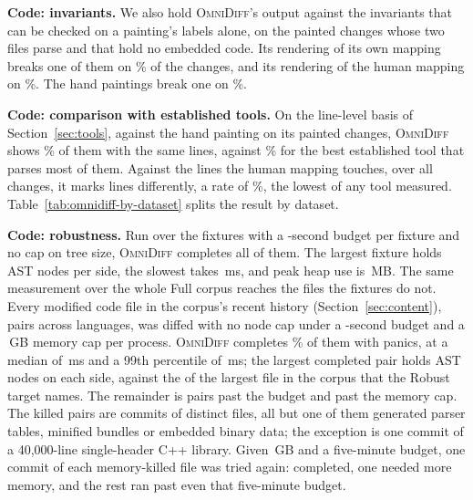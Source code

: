 \documentclass[sigconf,review]{acmart}
\begin{document}
\textbf{Code: invariants.} We also hold \textsc{OmniDiff}'s output against the
\InvariantLabelCount{} invariants that can be checked on a painting's labels alone, on the
\InvariantFixtures{} painted changes whose two files parse and that hold no embedded code. Its
rendering of its own mapping breaks one of them on \InvariantLabelToolRenderedFixturesPct{}\% of
the changes, and its rendering of the human mapping on
\InvariantLabelHumanRenderedFixturesPct{}\%. The hand paintings break one on
\InvariantLabelHumanFixturesPct{}\%.

\textbf{Code: comparison with established tools.} On the line-level basis of
Section~\ref{sec:tools}, against the hand painting on its \OmniDiffPaintingLineFixtures{} painted
changes, \textsc{OmniDiff} shows \OmniDiffPaintingLinePerfectPct{}\% of them with the same lines,
against \DifftasticPaintingLinePerfectPct{}\% for the best established tool that parses most of
them. Against the lines the human mapping touches, over all \OmniDiffFixtures{} changes, it marks
\OmniDiffLineMismatches{} lines differently, a rate of \OmniDiffLineRate{}\%, the lowest of any
tool measured. Table~\ref{tab:omnidiff-by-dataset} splits the result by
dataset.



\textbf{Code: robustness.} Run over the \RobustnessFixtures{} fixtures with a
\RobustnessTimeoutSeconds{}-second budget per fixture and no cap on tree size,
\textsc{OmniDiff} completes all of them. The largest fixture holds \RobustnessMaxNodes{}
AST nodes per side, the slowest takes \RobustnessSlowestMs{}\,ms, and peak heap use is
\RobustnessPeakMemoryMb{}\,MB. The same measurement over the whole Full corpus reaches the files
the fixtures do not. Every modified code file in the corpus's recent history
(Section~\ref{sec:content}), \RobustnessFullAttempted{} pairs across
\RobustnessFullLanguages{} languages, was diffed with no node cap under a
\RobustnessFullTimeoutSeconds{}-second budget and a \RobustnessFullMemoryCapGb{}\,GB memory cap
per process. \textsc{OmniDiff} completes \RobustnessFullCompletedPct{}\% of them with
\RobustnessFullPanicked{} panics, at a median of \RobustnessFullPFiftyMs{}\,ms and a 99th
percentile of \RobustnessFullPNinetyNineMs{}\,ms; the largest completed pair holds
\RobustnessFullMaxSideNodes{} AST nodes on each side, against the \AstMax{} of the largest file
in the corpus that the Robust target names. The remainder is \RobustnessFullTimedOut{} pairs past
the budget and \RobustnessFullKilled{} past the memory cap. The killed pairs are commits of
\RobustnessFullKilledFiles{} distinct files, all but one of them generated parser tables,
minified bundles or embedded binary data; the exception is one commit of a 40,000-line
single-header C++ library. Given \RobustnessFullBigMemoryCapGb{}\,GB and a five-minute budget, one
commit of each memory-killed file was tried again: \RobustnessFullKilledFilesCompletedUnderBigCap{}
completed, one needed more memory, and the rest ran past even that five-minute budget.
\end{document}
